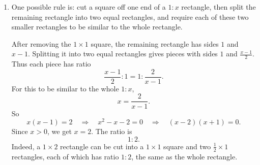 \documentclass[11pt,a4paper]{article}
\begin{document}
\begin{enumerate}[label=\textbf{Q\arabic*.}, leftmargin=*, itemsep=1.2em]
\begin{enumerate}[label=(\alph*)]
\item One possible rule is: cut a square off one end of a \(1:x\) rectangle, then split the remaining rectangle into two equal rectangles, and require each of these two smaller rectangles to be similar to the whole rectangle.

After removing the \(1\times1\) square, the remaining rectangle has sides \(1\) and \(x-1\). Splitting it into two equal rectangles gives pieces with sides \(1\) and \(\frac{x-1}{2}\). Thus each piece has ratio
\[
\frac{x-1}{2}:1=1:\frac{2}{x-1}.
\]
For this to be similar to the whole \(1:x\),
\[
x=\frac{2}{x-1}.
\]
So
\[
x(x-1)=2
\quad\Longrightarrow\quad
x^2-x-2=0
\quad\Longrightarrow\quad
(x-2)(x+1)=0.
\]
Since \(x>0\), we get \(x=2\). The ratio is
\[
1:2.
\]
Indeed, a \(1\times2\) rectangle can be cut into a \(1\times1\) square and two \(\frac12\times1\) rectangles, each of which has ratio \(1:2\), the same as the whole rectangle.
\end{enumerate}

\end{enumerate}
\end{document}
